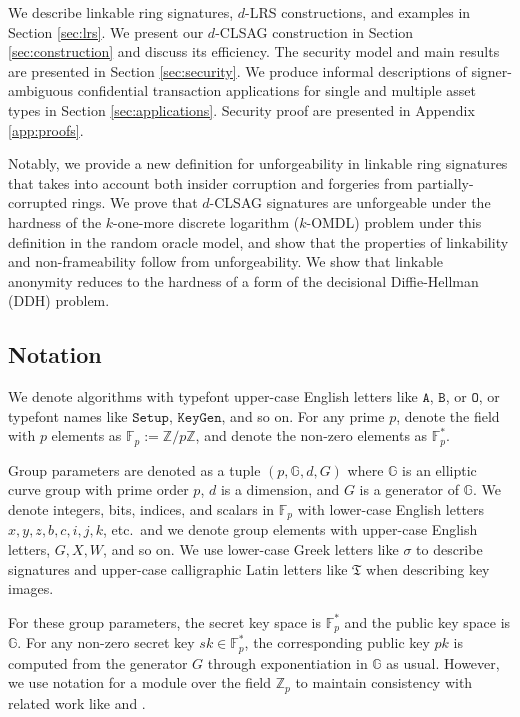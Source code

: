 \documentclass[draft]{llncs} %
\begin{document}
We describe linkable ring signatures, $d$-LRS constructions, and examples in Section \ref{sec:lrs}. We present our $d$-CLSAG construction in Section \ref{sec:construction} and discuss its efficiency. The security model and main results are presented in Section \ref{sec:security}. We produce informal descriptions of signer-ambiguous confidential transaction applications for single and multiple asset types in Section \ref{sec:applications}. Security proof are presented in Appendix \ref{app:proofs}.

Notably, we provide a new definition for unforgeability in linkable ring signatures that takes into account both insider corruption and forgeries from partially-corrupted rings. We prove that $d$-CLSAG signatures are unforgeable under the hardness of the $k$-one-more discrete logarithm ($k$-OMDL) problem under this definition in the random oracle model, and show that  the properties of linkability and non-frameability follow from unforgeability. We show that linkable anonymity reduces to the hardness of a form of the decisional Diffie-Hellman (DDH) problem.


\subsection{Notation}\label{sec:notation}

We denote algorithms with typefont upper-case English letters like $\texttt{A}$, $\texttt{B}$, or $\texttt{O}$, or typefont names like $\texttt{Setup}$, $\texttt{KeyGen}$, and so on.  For any prime $p$, denote the field with $p$ elements as $\mathbb{F}_p := \mathbb{Z}/p\mathbb{Z}$, and denote the non-zero elements as $\mathbb{F}_p^*$.

Group parameters are denoted as a tuple $(p, \mathbb{G}, d, G)$ where $\mathbb{G}$ is an elliptic curve group with prime order $p$, $d$ is a dimension, and $G$ is a generator of $\mathbb{G}$. We denote integers, bits, indices, and scalars in $\mathbb{F}_p$ with lower-case English letters $x, y, z, b, c, i, j, k$, etc.\ and we denote group elements with upper-case English letters, $G, X, W$, and so on. We use lower-case Greek letters like $\sigma$ to describe signatures and upper-case calligraphic Latin letters like $\mathfrak{T}$ when describing key images.

For these group parameters, the secret key space is $\mathbb{F}_p^*$ and the public key space is $\mathbb{G}$. For any non-zero secret key $\textit{sk} \in \mathbb{F}_p^*$, the corresponding public key $\textit{pk}$ is computed from the generator $G$ through exponentiation in $\mathbb{G}$ as usual. However, we use notation for a module over the field $\mathbb{Z}_p$ to maintain consistency with related work like \cite{van2013cryptonote} and \cite{noether}.
\end{document}
